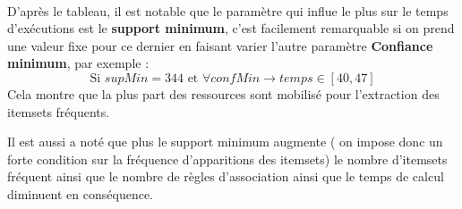 			\paragraph{}
			D'après le tableau, il est notable que le paramètre qui influe le plus sur le temps d'exécutions est le \textbf{support minimum}, c'est facilement remarquable si on prend une valeur fixe pour ce dernier en faisant varier l'autre paramètre \textbf{Confiance minimum}, par exemple : \\
			\[
				\text{Si } supMin = 344 \text{ et } \forall confMin \rightarrow temps \in \left[ 40,47\right]
			\]
			Cela montre que la plus part des ressources sont mobilisé pour l'extraction des itemsets fréquents.
			\par Il est aussi a noté que plus le support minimum augmente ( on impose donc un forte condition sur la fréquence d'apparitions des itemsets) le nombre d'itemsets fréquent ainsi que le nombre de règles d'association ainsi que le temps de calcul diminuent en conséquence.

	